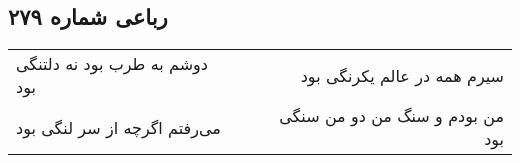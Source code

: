 \begin{center}
\section*{رباعی شماره ۲۷۹}
\label{sec:sh279}
\begin{longtable}{l p{0.5cm} r}
دوشم به طرب بود نه دلتنگی بود
&&
سیرم همه در عالم یکرنگی بود
\\
می‌رفتم اگرچه از سر لنگی بود
&&
من بودم و سنگ من دو من سنگی بود
\\
\end{longtable}
\end{center}
